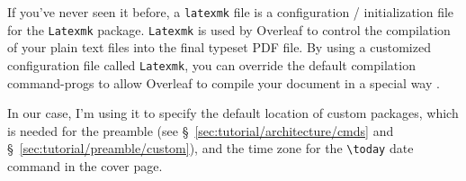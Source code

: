 If you've never seen it before, a \texttt{latexmk} file is a configuration / initialization file for the \texttt{Latexmk} package. \texttt{Latexmk} is used by Overleaf to control the compilation of your plain text files into the final typeset \gls{PDF} file. By using a customized configuration file called \texttt{Latexmk}, you can override the default compilation \glspl{command-prog} to allow Overleaf to compile your document in a special way \parencite{web:overleaf-latexmkrc}.

In our case, I'm using it to specify the default location of custom \glspl{package}, which is needed for the preamble (see \S~\ref{sec:tutorial/architecture/cmds} and \S~\ref{sec:tutorial/preamble/custom}), and the time zone for the \texttt{\textbackslash{}today} date \gls{command} in the cover page.